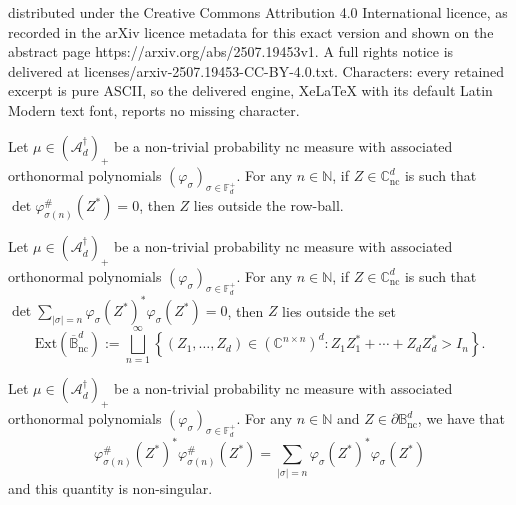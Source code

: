 \documentclass[10pt,a4paper]{amsart}
\def\BB{\mathbb{B}}
\def\CC{\mathbb{C}}
\def\FF{\mathbb{F}}
\def\NN{\mathbb{N}}
\def\dju{\bigsqcup_{n=1}^{\infty}}
\def\nc{\mathrm{nc}}
\def\p{\varphi}
\def\s{\sigma}
\newcommand\ncm[1]{(\mathscr{A}_{#1}^{\dagger})_+}
\begin{document}
distributed under the Creative Commons Attribution 4.0 International licence, as recorded in the arXiv licence metadata for this exact version and shown on the abstract page https://arxiv.org/abs/2507.19453v1. A full rights notice is delivered at licenses/arxiv-2507.19453-CC-BY-4.0.txt. Characters: every retained excerpt is pure ASCII, so the delivered engine, XeLaTeX with its default Latin Modern text font, reports no missing character.
\begin{lemma}
    \label{lem:ZerosOutside}
    Let \(\mu \in \ncm{d}\) be a non-trivial probability nc measure with associated orthonormal polynomials \((\p_\s)_{\s \in \FF_d^+}\). For any \(n \in \NN\), if \(Z \in \CC_\nc^d\) is such that \(\det \p_{\s(n)}^\#(Z^*) = 0\), then \(Z\) lies outside the row-ball.
\end{lemma}

\begin{lemma}
    \label{lem:ZerosInside}
    Let \(\mu \in \ncm{d}\) be a non-trivial probability nc measure with associated orthonormal polynomials \((\p_\s)_{\s \in \FF_d^+}\). For any \(n \in \NN\), if \(Z \in \CC_\nc^d\) is such that \(\det \sum_{\lvert \s \rvert = n} \p_\s(Z^*)^* \p_\s(Z^*) = 0\), then \(Z\) lies outside the set
    \[
        \mathrm{Ext}(\overline{\BB}^d_{\nc}) := \dju \left\{(Z_1, \ldots, Z_d) \in (\CC^{n \times n})^d : Z_1Z_1^* + \cdots + Z_dZ_d^* > I_n \right\}.
    \]
\end{lemma}

\begin{lemma}
    \label{lem:ZerosBoundary}
    Let \(\mu \in \ncm{d}\) be a non-trivial probability nc measure with associated orthonormal polynomials \((\p_\s)_{\s \in \FF_d^+}\). For any \(n \in \NN\) and \(Z \in \partial \BB^d_\nc\), we have that 
    \[
        \p_{\s(n)}^\#(Z^*)^* \p_{\s(n)}^\#(Z^*) = \sum_{\lvert \s \rvert = n} \p_\s(Z^*)^*\p_\s(Z^*)
    \]
    and this quantity is non-singular.
\end{lemma}  
\end{document}
